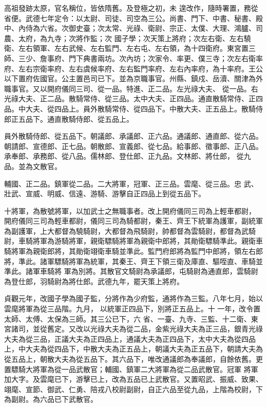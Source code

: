 
\begin{pinyinscope}

 高祖發跡太原，官名稱位，皆依隋舊。及登極之初，未
 遑改作，隨時署置，務從省便。武德七年定令：以太尉、司徒、司空為三公。尚書、門下、中書、秘書、殿中、內侍為六省。次御史臺；次太常、光祿、衛尉、宗正、太僕、大理、鴻臚、司農、太府，為九寺；次將作監；次
 國子學；次天策上將府；次左右衛、左右驍衛、左右領軍、左右武候、左右監門、左右屯、左右領，為十四衛府。東宮置三師、三少、詹事府、門下典書兩坊。次內坊；次家令、率更、僕三寺；次左右衛率府、左右宗衛率府、左右虞候率府、左右監門率府、左右內率府，為十率府。王公以下置府佐國官。公主置邑司已下。並為京職事官。州縣、鎮戍、岳瀆、關津為外職事官。又以開府儀同三司、從一品。特進、正二品。左光祿大夫、
 從一品。右光祿大夫、正二品。散騎常侍、從三品。太中大夫、正四品。通直散騎常侍、正四品。中大夫、從四品上。員外散騎常侍、從四品下。中散大夫、正五品上。散騎侍郎正五品下。通直散騎侍郎、從五品上。



 員外散騎侍郎、從五品下。朝議郎、承議郎、正六品。通議郎、通直郎、從六品。朝請郎、宣德郎、正七品。朝散郎、宣義郎、從七品。給事郎、徵事郎、正八品。承奉郎、承務郎、從八品。儒林郎、登仕郎、正九品。文林郎、將仕郎，
 從九品。並為文散官。



 輔國、正二品。鎮軍從二品。二大將軍，冠軍、正三品。雲麾、從三品。忠
 武、壯武、宣威、明威、信遠、游騎、游擊自正四品上到從五品下。



 十將軍，為散號將軍，以加武士之無職事者。改上開府儀同三司為上輕車都尉，
 開府儀同三司為輕車都尉，儀同三司為騎都尉，秦王、齊王下統軍為護軍，副統軍為副護軍，上大都督為驍騎尉，大都督為飛騎尉，帥都督為雲騎尉，都督為武騎尉，車騎將軍為游騎將軍，親衛驃騎將軍為親衛中郎將，其勛衛驃騎準此。親衛車騎將軍為親衛郎將，其勛衛翊衛車騎並準此。監門府郎將為監門中郎將，領左右郎將，準此。諸軍驃騎將軍為統軍，其秦王、齊王下領三衛及庫直、驅咥直、車騎並準此。諸軍車騎將
 軍為別將。其散官文騎尉為承議郎，屯騎尉為通直郎，雲騎尉為登仕郎，羽騎尉為將仕郎。武德九年，罷天策上將府。



 貞觀元年，改國子學為國子監，分將作為少府監，通將作為三監。八年七月，始以雲麾將軍為從三品階。九月，
 以統軍正四品下，別將正五品上。十
 一年，改令置太師、太傅、太保為三師。其三公已下，六
 省、一臺、九寺、三監、十二衛、東宮諸司，並從舊定。又改以光祿大夫為從二品，金紫光祿大夫為正三品，銀青光祿大夫為從三品，正議大夫為正四品上，通議大夫為正四品下，太中大夫為從四品上，中大夫為從四品下，中散大夫為正五品上，朝議大夫為正五品下，朝請大夫為從五品上，朝散大夫為從五品下。其六品下，唯改通議郎為奉議郎，自餘依舊。更置驃騎大將軍為從一品武散官；輔國、鎮軍二大將軍為從二品武散官。冠軍
 將軍加大字。及雲麾已下，游擊已上，改為五品已上武散官。又置昭武、振威、致果、翊麾、宣節、御武、仁勇、陪戎八校尉副尉，自正六品至從九品，上階為校尉，下為副尉。為六品已下武散官。




\end{pinyinscope}
